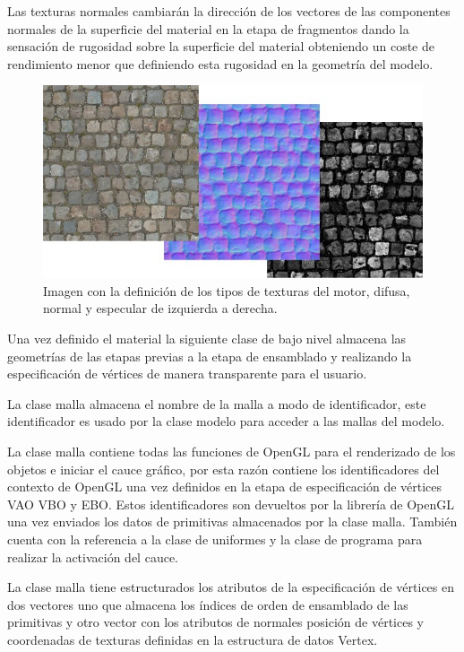 \documentclass[a4paper, 17pt]{book}
\begin{document}
Las texturas normales cambiarán la dirección de los vectores de las componentes normales de la superficie del material en la etapa de
fragmentos dando la sensación de rugosidad sobre la superficie del material obteniendo un coste de rendimiento menor que definiendo
esta rugosidad en la geometría del modelo.

\begin{figure}[hbt!]
    \centering
    \includegraphics[scale=0.45, keepaspectratio]{img/custom-textures.jpg}
    \caption{Imagen con la definición de los tipos de texturas del motor, difusa, normal y especular de izquierda a derecha.}
    \label{figura:Texture}
\end{figure}

Una vez definido el material la siguiente clase de bajo nivel almacena las geometrías de las etapas previas a la etapa de ensamblado y
realizando la especificación de vértices de manera transparente para el usuario.

La clase malla    almacena el nombre de la malla a modo de identificador, este identificador es usado por la clase modelo para acceder
a las mallas del modelo. 

La clase malla contiene todas las funciones de OpenGL para el renderizado de los objetos e iniciar el cauce gráfico, por esta razón
contiene los identificadores del contexto de OpenGL una vez definidos en la etapa de especificación de vértices VAO VBO y EBO. Estos
identificadores son devueltos por la librería de OpenGL una vez enviados los datos de primitivas almacenados por la clase malla.
También cuenta con la referencia a la clase de uniformes y la clase de programa para realizar la activación del cauce.

La clase malla tiene estructurados los atributos de la especificación de vértices en dos vectores uno que almacena los índices de
orden de ensamblado de las primitivas y otro vector con los atributos de normales posición de vértices y coordenadas de texturas
definidas en la estructura de datos Vertex.
\end{document}
